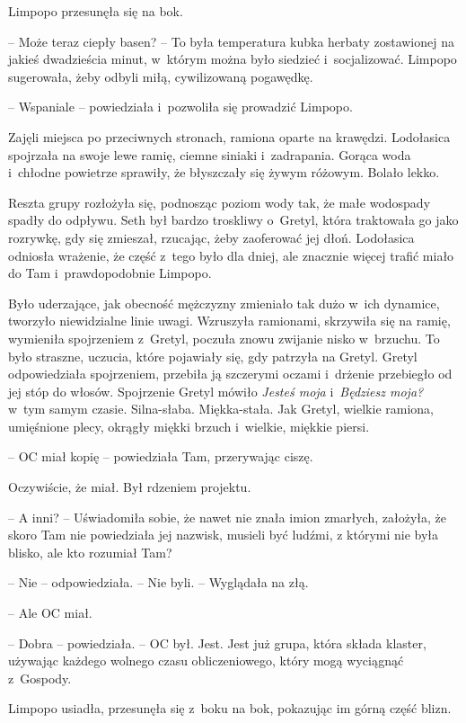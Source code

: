 \documentclass[oneside,polish,11pt,sfheadings]{mwbk}
\begin{document}
Limpopo przesunęła się na bok. 

-- Może teraz ciepły basen? -- To była
temperatura kubka herbaty zostawionej na jakieś dwadzieścia minut, w~którym można było siedzieć i~socjalizować. Limpopo sugerowała, żeby
odbyli miłą, cywilizowaną pogawędkę.

-- Wspaniale -- powiedziała i~pozwoliła się prowadzić Limpopo.

Zajęli miejsca po przeciwnych stronach, ramiona oparte na krawędzi.
Lodołasica spojrzała na swoje lewe ramię, ciemne siniaki i~zadrapania.
Gorąca woda i~chłodne powietrze sprawiły, że błyszczały się żywym
różowym. Bolało lekko.

Reszta grupy rozłożyła się, podnosząc poziom wody tak, że małe wodospady
spadły do odpływu. Seth był bardzo troskliwy o~Gretyl, która traktowała
go jako rozrywkę, gdy się zmieszał, rzucając, żeby zaoferować jej dłoń.
Lodołasica odniosła wrażenie, że część z~tego było dla dniej, ale
znacznie więcej trafić miało do Tam i~prawdopodobnie Limpopo.

Było uderzające, jak obecność mężczyzny zmieniało tak dużo w~ich
dynamice, tworzyło niewidzialne linie uwagi. Wzruszyła ramionami,
skrzywiła się na ramię, wymieniła spojrzeniem z~Gretyl, poczuła znowu
zwijanie nisko w~brzuchu. To było straszne, uczucia, które pojawiały
się, gdy patrzyła na Gretyl. Gretyl odpowiedziała spojrzeniem, przebiła
ją szczerymi oczami i~drżenie przebiegło od jej stóp do włosów.
Spojrzenie Gretyl mówiło \textit{Jesteś moja} i~\textit{Będziesz moja?} w~tym samym czasie. Silna-słaba. Miękka-stała. Jak Gretyl, wielkie
ramiona, umięśnione plecy, okrągły miękki brzuch i~wielkie, miękkie
piersi.

-- OC miał kopię -- powiedziała Tam, przerywając ciszę.

Oczywiście, że miał. Był rdzeniem projektu.

-- A inni? -- Uświadomiła sobie, że nawet nie znała imion zmarłych,
założyła, że skoro Tam nie powiedziała jej nazwisk, musieli być ludźmi,
z którymi nie była blisko, ale kto rozumiał Tam?

-- Nie -- odpowiedziała. -- Nie byli. -- Wyglądała na złą.

-- Ale OC miał.

-- Dobra -- powiedziała. -- OC był. Jest. Jest już grupa, która składa
klaster, używając każdego wolnego czasu obliczeniowego, który mogą
wyciągnąć z~Gospody.

Limpopo usiadła, przesunęła się z~boku na bok, pokazując im górną część
blizn. 
\end{document}
